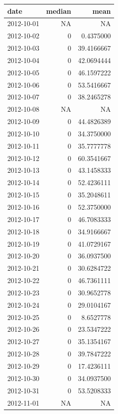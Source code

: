 \documentclass[
]{article}
\begin{document}
\begin{table}
\centering
\begin{tabular}[t]{l|r|r}
\hline
date & median & mean\\
\hline
2012-10-01 & NA & NA\\
\hline
2012-10-02 & 0 & 0.4375000\\
\hline
2012-10-03 & 0 & 39.4166667\\
\hline
2012-10-04 & 0 & 42.0694444\\
\hline
2012-10-05 & 0 & 46.1597222\\
\hline
2012-10-06 & 0 & 53.5416667\\
\hline
2012-10-07 & 0 & 38.2465278\\
\hline
2012-10-08 & NA & NA\\
\hline
2012-10-09 & 0 & 44.4826389\\
\hline
2012-10-10 & 0 & 34.3750000\\
\hline
2012-10-11 & 0 & 35.7777778\\
\hline
2012-10-12 & 0 & 60.3541667\\
\hline
2012-10-13 & 0 & 43.1458333\\
\hline
2012-10-14 & 0 & 52.4236111\\
\hline
2012-10-15 & 0 & 35.2048611\\
\hline
2012-10-16 & 0 & 52.3750000\\
\hline
2012-10-17 & 0 & 46.7083333\\
\hline
2012-10-18 & 0 & 34.9166667\\
\hline
2012-10-19 & 0 & 41.0729167\\
\hline
2012-10-20 & 0 & 36.0937500\\
\hline
2012-10-21 & 0 & 30.6284722\\
\hline
2012-10-22 & 0 & 46.7361111\\
\hline
2012-10-23 & 0 & 30.9652778\\
\hline
2012-10-24 & 0 & 29.0104167\\
\hline
2012-10-25 & 0 & 8.6527778\\
\hline
2012-10-26 & 0 & 23.5347222\\
\hline
2012-10-27 & 0 & 35.1354167\\
\hline
2012-10-28 & 0 & 39.7847222\\
\hline
2012-10-29 & 0 & 17.4236111\\
\hline
2012-10-30 & 0 & 34.0937500\\
\hline
2012-10-31 & 0 & 53.5208333\\
\hline
2012-11-01 & NA & NA\\

\end{tabular}
\end{table}
\end{document}
